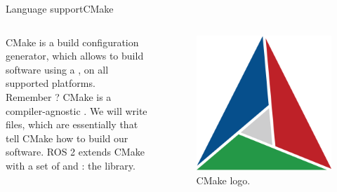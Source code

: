\begin{frame}{Language support}{CMake}
  \begin{columns}
    CMake is a  build configuration generator, which allows to build software using a ,  on all supported platforms.\\
    Remember ? CMake is a compiler-agnostic .
    \newline\newline
    We will write  files, which are essentially  that tell CMake how to build our software.
    \newline\newline
    ROS 2 extends CMake with a set of  and : the \href{https://docs.ros.org/en/humble/How-To-Guides/Ament-CMake-Documentation.html}{} library.

    \begin{figure}
      \centering
      \includegraphics[width=.7\textwidth]{cmake}
      \caption{CMake logo.}
      \label{fig:cmake}
    \end{figure}
  \end{columns}
\end{frame}
